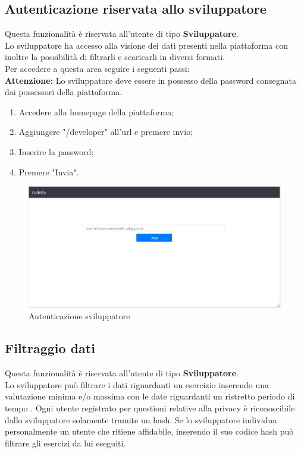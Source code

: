 \documentclass[11pt,a4paper]{article}
\begin{document}
{	\subsection{Autenticazione riservata allo sviluppatore}
		Questa funzionalità è riservata all'utente di tipo \textbf{Sviluppatore}.\\
		
		Lo sviluppatore ha accesso alla visione dei dati presenti nella piattaforma con inoltre la possibilità di filtrarli e scaricarli in diversi formati.\\ Per accedere a questa area seguire i seguenti passi:\\
		
		\textbf{Attenzione:} Lo sviluppatore deve essere in possesso della password consegnata dai possessori della piattaforma.
		
		\begin{enumerate}
			\item Accedere alla homepage della piattaforma;
			\item Aggiungere "/developer" all'url e premere invio;
			\item Inserire la password;
			\item Premere "Invia".
		\end{enumerate}
	
	\begin{figure}[h]
		\centering
		\includegraphics[scale=0.65]{images/homesviluppatore.jpg}
		\caption{Autenticazione sviluppatore}
	\end{figure}

	\newpage
	\subsection{Filtraggio dati}
		Questa funzionalità è riservata all'utente di tipo \textbf{Sviluppatore}.\\
		Lo sviluppatore può filtrare i dati riguardanti un esercizio inserendo una valutazione minima e/o massima con le date riguardanti un ristretto periodo di tempo . Ogni utente registrato per questioni relative alla privacy è riconoscibile dallo sviluppatore solamente tramite un hash. Se lo sviluppatore individua personalmente un utente che ritiene affidabile, inserendo il suo codice hash può filtrare gli esercizi da lui eseguiti.
		
}
\end{document}
